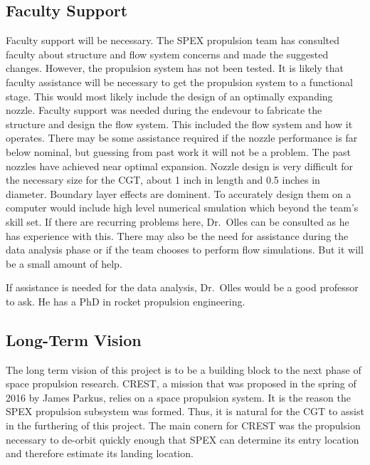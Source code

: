 \documentclass[conference]{IEEEtran} %
\begin{document}
\subsection{Faculty Support}
Faculty support will be necessary. The SPEX propulsion team has consulted faculty about structure and flow system concerns and made the suggested changes. However, the propulsion system
has not been tested. It is likely that faculty assistance will be necessary to get the propulsion system to a functional stage. This would most likely include the design of an optimally expanding
nozzle. Faculty support was needed during the endevour to fabricate the structure and design the flow system.
This included the flow system and how it operates.
There may be some assistance required if the nozzle performance is far below nominal, but guessing from past work it will not be a problem. The past nozzles have achieved
near optimal expansion. Nozzle design is very difficult for the necessary size for the CGT, about 1 inch in length and 0.5 inches in diameter. Boundary layer effects are dominent. To accurately design them
on a computer would include high level numerical smulation which beyond the team's skill set. If there are recurring problems here, Dr.\ Olles can be consulted as he has experience with this.
There may also be the need for assistance during the data analysis phase or if the team chooses to perform flow simulations. But it will be a small amount of help.

If assistance is needed for the data analysis, Dr.\ Olles would be a good professor to ask. He has a PhD in rocket propulsion engineering.
\subsection{Long-Term Vision}
\label{sec:vision}

The long term vision of this project is to be a building block to the next phase of space propulsion research. CREST, a mission that was proposed in the
spring of 2016 by James Parkus, relies on a space propulsion system. It is the reason the SPEX propulsion subsystem was formed. Thus, it is natural for the
CGT to assist in the furthering of this project. The main conern for CREST was the propulsion necessary to de-orbit quickly enough that SPEX can determine its entry location and therefore estimate its landing location.
\end{document}
